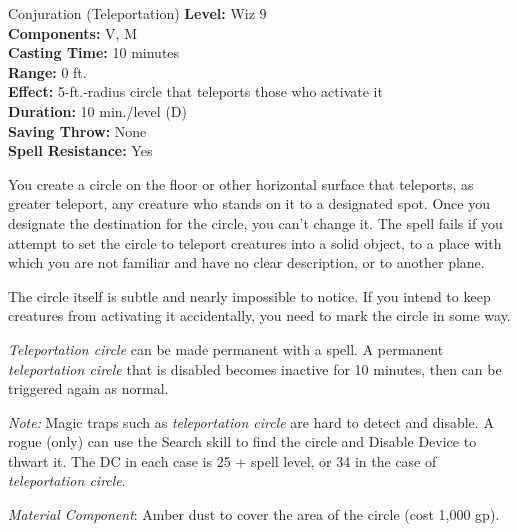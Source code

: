 {Conjuration (Teleportation)}
{
	\textbf{Level:}
	Wiz 9\\
	\textbf{Components:}
	V, M\\
	\textbf{Casting Time:}
	10 minutes\\
	\textbf{Range:}
	0 ft.\\
	\textbf{Effect:}
	5-ft.-radius circle that teleports those who activate it\\
	\textbf{Duration:}
	10 min./level (D)\\
	\textbf{Saving Throw:}
	None\\
	\textbf{Spell Resistance:}
	Yes\\
}
{
	You create a circle on the floor or other horizontal surface that teleports, as greater teleport, any creature who stands on it to a designated spot. Once you designate the destination for the circle, you can't change it. The spell fails if you attempt to set the circle to teleport creatures into a solid object, to a place with which you are not familiar and have no clear description, or to another plane.

	The circle itself is subtle and nearly impossible to notice. If you intend to keep creatures from activating it accidentally, you need to mark the circle in some way.

	\emph{Teleportation circle} can be made permanent with a  spell. A permanent \emph{teleportation circle} that is disabled becomes inactive for 10 minutes, then can be triggered again as normal.

	\textit{Note:}
	Magic traps such as \emph{teleportation circle} are hard to detect and disable. A rogue (only) can use the Search skill to find the circle and Disable Device to thwart it. The DC in each case is 25 + spell level, or 34 in the case of \emph{teleportation circle}.

	\textit{Material Component}:
	Amber dust to cover the area of the circle (cost 1,000 gp).

}
